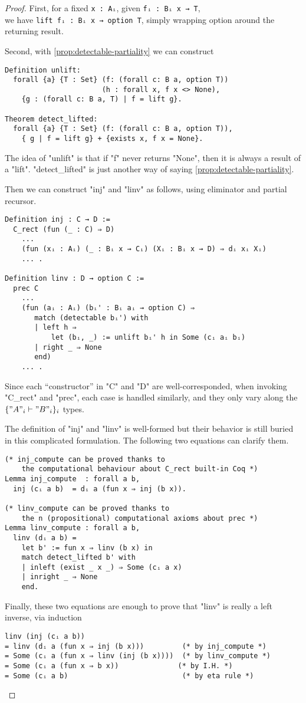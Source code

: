 \begin{proof} 
First, for a fixed \texttt{x : Aᵢ}, given \texttt{fᵢ :  Bᵢ x → T},
\\ we have \texttt{lift fᵢ : Bᵢ x → option T}, simply wrapping option around the returning result.
  
Second, with \ref{prop:detectable-partiality} we can construct
\begin{verbatim}
Definition unlift:
  forall {a} {T : Set} (f: (forall c: B a, option T)) 
                       (h : forall x, f x <> None),
    {g : (forall c: B a, T) | f = lift g}.
  
Theorem detect_lifted:
  forall {a} {T : Set} (f: (forall c: B a, option T)),
    { g | f = lift g} + {exists x, f x = None}.
\end{verbatim}
The idea of "unlift" is that if "f" never returns "None", then it is always a result of a "lift". "detect_lifted" is just another way of saying  \ref{prop:detectable-partiality}.

  
Then we can construct "inj" and "linv" as follows, using eliminator and partial recursor.
\begin{verbatim}
Definition inj : C → D :=
  C_rect (fun (_ : C) ⇒ D) 
    ...
    (fun (xᵢ : Aᵢ) (_ : Bᵢ x → Cᵢ) (Xᵢ : Bᵢ x → D) ⇒ dᵢ xᵢ Xᵢ)
    ... .

Definition linv : D → option C :=
  prec C 
    ...
    (fun (aᵢ : Aᵢ) (bᵢ' : Bᵢ aᵢ → option C) ⇒
       match (detectable bᵢ') with
       | left h ⇒
           let (bᵢ, _) := unlift bᵢ' h in Some (cᵢ aᵢ bᵢ)
       | right _ ⇒ None
       end)
    ... .
\end{verbatim}
Since each ``constructor'' in "C" and "D" are well-corresponded, when invoking "C_rect" and "prec", each case is handled similarly, and they only vary along the $\{ "A"_i \vdash "B"_i \}_{i}$ types.

The definition of "inj" and "linv" is well-formed but their behavior is still buried in this complicated formulation. The following two equations can clarify them. 

\begin{verbatim}
(* inj_compute can be proved thanks to 
    the computational behaviour about C_rect built-in Coq *)
Lemma inj_compute  : forall a b,
  inj (cᵢ a b)  = dᵢ a (fun x ⇒ inj (b x)).

(* linv_compute can be proved thanks to 
    the n (propositional) computational axioms about prec *)
Lemma linv_compute : forall a b,
  linv (dᵢ a b) = 
    let b' := fun x ⇒ linv (b x) in 
    match detect_lifted b' with
    | inleft (exist _ x _) ⇒ Some (cᵢ a x)
    | inright _ ⇒ None
    end.
\end{verbatim}

Finally,  these two equations are enough to prove that "linv" is really a left inverse, via induction
\begin{verbatim}
linv (inj (cᵢ a b)) 
= linv (dᵢ a (fun x ⇒ inj (b x)))         (* by inj_compute *)
= Some (cᵢ a (fun x ⇒ linv (inj (b x))))  (* by linv_compute *)
= Some (cᵢ a (fun x ⇒ b x))              (* by I.H. *)
= Some (cᵢ a b)                           (* by eta rule *)
\end{verbatim}
\end{proof}


